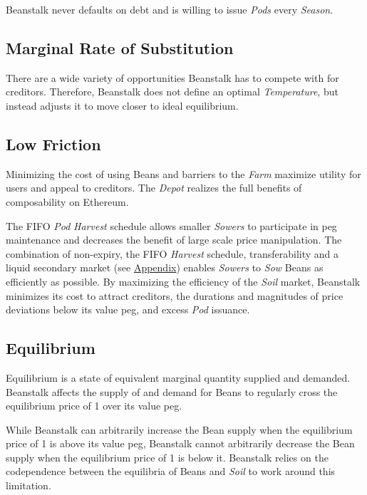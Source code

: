 \documentclass[tikz]{article}
\newcommand{\term}[1]{\textsl{#1}}
\newcommand{\Bean}{} %
\begin{document}
Beanstalk never defaults on debt and is willing to issue \term{Pods} every \term{Season}. 

\vspace*{-1.75mm}
\subsection{Marginal Rate of Substitution}
\vspace*{-1.75mm}
There are a wide variety of opportunities Beanstalk has to compete with for creditors. Therefore, Beanstalk does not define an optimal \term{Temperature}, but instead adjusts it to move closer to ideal equilibrium. 

\vspace*{-1.75mm}
\subsection{Low Friction}
\vspace*{-1.75mm}
Minimizing the cost of using Beans and barriers to the \term{Farm} maximize utility for users and appeal to creditors. The \term{Depot} realizes the full benefits of composability on Ethereum.

The FIFO \term{Pod} \term{Harvest} schedule allows smaller \term{Sowers} to participate in peg maintenance and decreases the benefit of large scale price manipulation. The combination of non-expiry, the FIFO \term{Harvest} schedule, transferability and a liquid secondary market (see \hyperlink{subsection.14.5}{Appendix}) enables \term{Sowers} to \term{Sow} Beans as efficiently as possible. By maximizing the efficiency of the \term{Soil} market, Beanstalk minimizes its cost to attract creditors, the durations and magnitudes of price deviations below its value peg, and excess \term{Pod} issuance.

\vspace*{-1.75mm}
\subsection{Equilibrium}
\vspace*{-1.75mm}
Equilibrium is a state of equivalent marginal quantity supplied and demanded. Beanstalk affects the supply of and demand for Beans to regularly cross the equilibrium price of \Bean1 over its value peg. 

While Beanstalk can arbitrarily increase the Bean supply when the equilibrium price of \Bean1 is above its value peg, Beanstalk cannot arbitrarily decrease the Bean supply when the equilibrium price of \Bean1 is below it. Beanstalk relies on the codependence between the equilibria of Beans and \term{Soil} to work around this limitation. 
\end{document}
